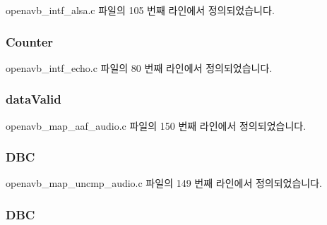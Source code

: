 openavb\+\_\+intf\+\_\+alsa.\+c 파일의 105 번째 라인에서 정의되었습니다.

\subsubsection[{\texorpdfstring{Counter}{Counter}}]{ Counter}\hypertarget{structpvt__data__t_aa080e93f0320a9edbaa158681045d365}{}\label{structpvt__data__t_aa080e93f0320a9edbaa158681045d365}


openavb\+\_\+intf\+\_\+echo.\+c 파일의 80 번째 라인에서 정의되었습니다.

\subsubsection[{\texorpdfstring{data\+Valid}{dataValid}}]{ data\+Valid}\hypertarget{structpvt__data__t_ae027c1868c7c7379501f78f8973c95e8}{}\label{structpvt__data__t_ae027c1868c7c7379501f78f8973c95e8}


openavb\+\_\+map\+\_\+aaf\+\_\+audio.\+c 파일의 150 번째 라인에서 정의되었습니다.

\subsubsection[{\texorpdfstring{D\+BC}{DBC}}]{ D\+BC}\hypertarget{structpvt__data__t_afe92f440c40fd4755efbb463a5a91789}{}\label{structpvt__data__t_afe92f440c40fd4755efbb463a5a91789}


openavb\+\_\+map\+\_\+uncmp\+\_\+audio.\+c 파일의 149 번째 라인에서 정의되었습니다.

\subsubsection[{\texorpdfstring{D\+BC}{DBC}}]{ D\+BC}\hypertarget{structpvt__data__t_aa05e00460f8849cf9f5a16d7a5d6a73e}{}\label{structpvt__data__t_aa05e00460f8849cf9f5a16d7a5d6a73e}



